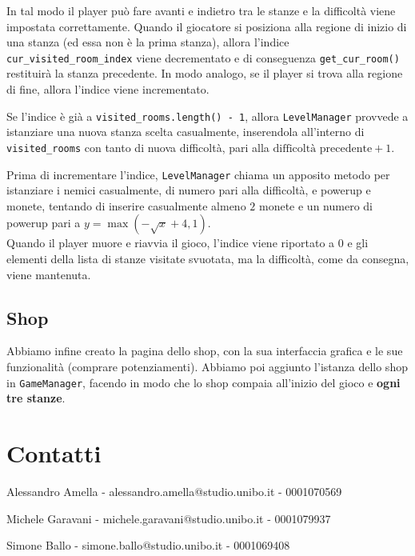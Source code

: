 \documentclass[a4paper,12pt]{article}
\begin{document}
In tal modo il player può fare avanti e indietro tra le stanze e la difficoltà viene impostata correttamente.
Quando il giocatore si posiziona alla regione di inizio di una stanza (ed essa non è la prima stanza), allora l’indice \texttt{cur\_visited\_room\_index} viene decrementato e di conseguenza \texttt{get\_cur\_room()} restituirà la stanza precedente.
In modo analogo, se il player si trova alla regione di fine, allora l'indice viene incrementato. 

Se l’indice è già a \texttt{visited\_rooms.length() - 1}, allora \texttt{LevelManager} provvede a istanziare una nuova stanza scelta casualmente, inserendola all'interno di \texttt{visited\_rooms} con tanto di nuova difficoltà, pari alla $\text{difficoltà precedente} + 1$.

Prima di incrementare l'indice, \texttt{LevelManager} chiama un apposito metodo per istanziare i nemici casualmente, di numero pari alla difficoltà, e powerup e monete, tentando di inserire casualmente almeno $2$ monete e un numero di powerup pari a $y = \max\left(-\sqrt{x} + 4, 1\right)$. \\

Quando il player muore e riavvia il gioco, l’indice viene riportato a 0 e gli elementi della lista di stanze visitate svuotata, ma la difficoltà, come da consegna, viene mantenuta.

\subsection{Shop}

Abbiamo infine creato la pagina dello shop, con la sua interfaccia grafica e le sue funzionalità (comprare potenziamenti). Abbiamo poi aggiunto l’istanza dello shop in \texttt{GameManager}, facendo in modo che lo shop compaia all’inizio del gioco e \textbf{ogni tre stanze}.

\appendix
\section{Contatti}

\centering

Alessandro Amella - alessandro.amella@studio.unibo.it - 0001070569

Michele Garavani - michele.garavani@studio.unibo.it - 0001079937

Simone Ballo - simone.ballo@studio.unibo.it - 0001069408
\end{document}
